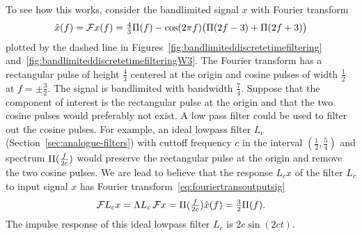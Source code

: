 To see how this works, consider the bandlimited signal $x$ with Fourier transform
\begin{equation}\label{eq:examplebandlimtedsignalforfiltering}
\hat{x}(f) = {\mathcal F} x(f) = \tfrac{4}{3}\Pi(f) - \cos(2\pi f) \big( \Pi(2f - 3) + \Pi(2f + 3) \big)
\end{equation}
plotted by the dashed line in Figures~\ref{fig:bandlimiteddiscretetimefiltering} and~\ref{fig:bandlimiteddiscretetimefilteringW3}.  The Fourier transform has a rectangular pulse of height $\tfrac{4}{3}$ centered at the origin and cosine pulses of width $\tfrac{1}{2}$ at $f = \pm \tfrac{3}{2}$.  The signal is bandlimited with bandwidth $\tfrac{7}{4}$.  Suppose that the component of interest is the rectangular pulse at the origin and that the two cosine pulses would preferably not exist.  A low pass filter could be used to filter out the cosine pulses.  For example, an ideal lowpass filter $L_c$ (Section~\ref{sec:analogue-filters}) with cuttoff frequency $c$ in the interval $(\tfrac{1}{2}, \tfrac{5}{4})$ and spectrum $\Pi(\tfrac{f}{2c})$ would preserve the rectangular pulse at the origin and remove the two cosine pulses.  We are lead to believe that the response $L_c x$ of the filter $L_c$ to input signal $x$ has Fourier transform~\eqref{eq:fouriertransoutputsig}
\[
{\mathcal F} L_c x = \Lambda L_c \, {\mathcal F} x = \Pi(\tfrac{f}{2c}) \hat{x}(f) = \tfrac{3}{2} \Pi(f).
\]
The impulse response of this ideal lowpass filter $L_c$ is $2c\sin(2ct)$.

